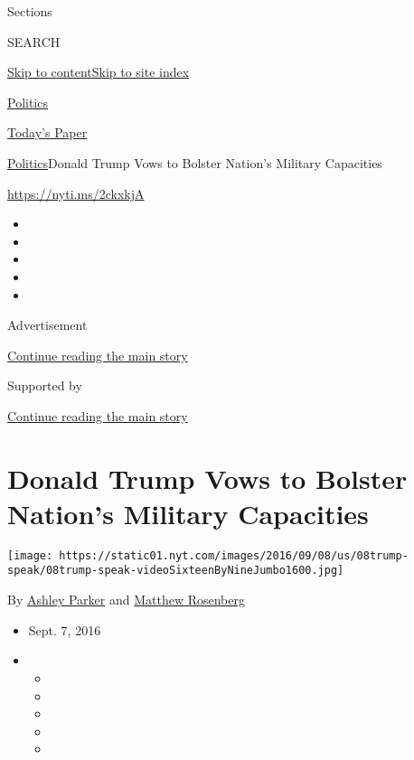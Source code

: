 Sections

SEARCH

\protect\hyperlink{site-content}{Skip to
content}\protect\hyperlink{site-index}{Skip to site index}

\href{https://www.nytimes.com/section/politics}{Politics}

\href{https://myaccount.nytimes.com/auth/login?response_type=cookie\&client_id=vi}{}

\href{https://www.nytimes.com/section/todayspaper}{Today's Paper}

\href{/section/politics}{Politics}\textbar{}Donald Trump Vows to Bolster
Nation's Military Capacities

\url{https://nyti.ms/2ckxkjA}

\begin{itemize}
\item
\item
\item
\item
\item
\end{itemize}

Advertisement

\protect\hyperlink{after-top}{Continue reading the main story}

Supported by

\protect\hyperlink{after-sponsor}{Continue reading the main story}

\hypertarget{donald-trump-vows-to-bolster-nations-military-capacities}{%
\section{Donald Trump Vows to Bolster Nation's Military
Capacities}\label{donald-trump-vows-to-bolster-nations-military-capacities}}

\texttt{[image: https://static01.nyt.com/images/2016/09/08/us/08trump-speak/08trump-speak-videoSixteenByNineJumbo1600.jpg]}

By \href{http://www.nytimes.com/by/ashley-parker}{Ashley Parker} and
\href{http://www.nytimes.com/by/matthew-rosenberg}{Matthew Rosenberg}

\begin{itemize}
\item
  Sept. 7, 2016
\item
  \begin{itemize}
  \item
  \item
  \item
  \item
  \item
  \end{itemize}
\end{itemize}

